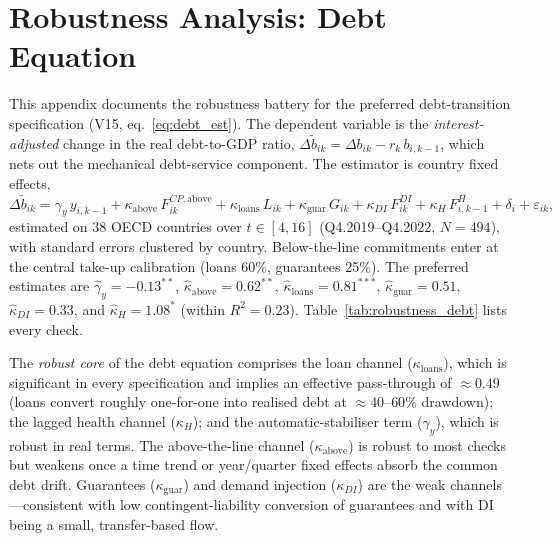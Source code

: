 \section{Robustness Analysis: Debt Equation}\label{app:robustness_debt}

This appendix documents the robustness battery for the preferred debt-transition
specification (V15, eq.~\ref{eq:debt_est}). The dependent variable is the
\emph{interest-adjusted} change in the real debt-to-GDP ratio,
$\Delta \tilde b_{ik}=\Delta b_{ik}-r_{k}\,b_{i,k-1}$, which nets out the
mechanical debt-service component. The estimator is country fixed effects,
\[
\Delta \tilde b_{ik}= \gamma_y\,y_{i,k-1}
   +\kappa_{\text{above}}\,F^{CP,\text{above}}_{ik}
   +\kappa_{\text{loans}}\,L_{ik}
   +\kappa_{\text{guar}}\,G_{ik}
   +\kappa_{DI}\,F^{DI}_{ik}
   +\kappa_{H}\,F^{H}_{i,k-1}
   +\delta_i+\varepsilon_{ik},
\]
estimated on 38 OECD countries over $t\in[4,16]$ (Q4.2019--Q4.2022, $N=494$),
with standard errors clustered by country. Below-the-line commitments enter at
the central take-up calibration (loans 60\%, guarantees 25\%). The preferred
estimates are
$\hat\gamma_y=-0.13^{**}$, $\hat\kappa_{\text{above}}=0.62^{**}$,
$\hat\kappa_{\text{loans}}=0.81^{***}$, $\hat\kappa_{\text{guar}}=0.51$,
$\hat\kappa_{DI}=0.33$, and $\hat\kappa_{H}=1.08^{*}$
(within $R^2=0.23$). Table~\ref{tab:robustness_debt} lists every check.

The \emph{robust core} of the debt equation comprises the loan channel
($\kappa_{\text{loans}}$), which is significant in every specification and
implies an effective pass-through of $\approx 0.49$ (loans convert roughly
one-for-one into realised debt at $\approx 40$--$60\%$ drawdown); the lagged
health channel ($\kappa_{H}$); and the automatic-stabiliser term
($\gamma_y$), which is robust in real terms. The above-the-line channel
($\kappa_{\text{above}}$) is robust to most checks but weakens once a time
trend or year/quarter fixed effects absorb the common debt drift. Guarantees
($\kappa_{\text{guar}}$) and demand injection ($\kappa_{DI}$) are the weak
channels---consistent with low contingent-liability conversion of guarantees
and with DI being a small, transfer-based flow.

